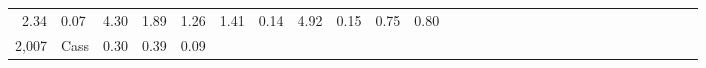 \documentclass[]{article}
\begin{document}
\begin{longtable}[]{@{}rlrrrrrrrrrrrrrrrrrrrrrrrrrrr@{}}
\begin{minipage}[t]{0.01\columnwidth}
2.34\strut
\end{minipage} & \begin{minipage}[t]{0.02\columnwidth}\raggedleft\strut
0.07\strut
\end{minipage} & \begin{minipage}[t]{0.02\columnwidth}\raggedleft\strut
4.30\strut
\end{minipage} & \begin{minipage}[t]{0.01\columnwidth}\raggedleft\strut
1.89\strut
\end{minipage} & \begin{minipage}[t]{0.01\columnwidth}\raggedleft\strut
1.26\strut
\end{minipage} & \begin{minipage}[t]{0.01\columnwidth}\raggedleft\strut
1.41\strut
\end{minipage} & \begin{minipage}[t]{0.02\columnwidth}\raggedleft\strut
0.14\strut
\end{minipage} & \begin{minipage}[t]{0.01\columnwidth}\raggedleft\strut
4.92\strut
\end{minipage} & \begin{minipage}[t]{0.01\columnwidth}\raggedleft\strut
0.15\strut
\end{minipage} & \begin{minipage}[t]{0.01\columnwidth}\raggedleft\strut
0.75\strut
\end{minipage} & \begin{minipage}[t]{0.01\columnwidth}\raggedleft\strut
0.80\strut
\end{minipage}\tabularnewline
\begin{minipage}[t]{0.01\columnwidth}\raggedleft\strut
2,007\strut
\end{minipage} & \begin{minipage}[t]{0.02\columnwidth}\raggedright\strut
Cass\strut
\end{minipage} & \begin{minipage}[t]{0.01\columnwidth}\raggedleft\strut
0.30\strut
\end{minipage} & \begin{minipage}[t]{0.02\columnwidth}\raggedleft\strut
0.39\strut
\end{minipage} & \begin{minipage}[t]{0.02\columnwidth}\raggedleft\strut
0.09\strut
\end{minipage} & \begin{minipage}[t]{0.02\columnwidth}\raggedleft\strut

\end{minipage}
\end{longtable}
\end{document}
